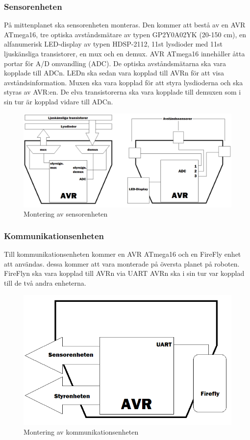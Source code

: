\subsubsection{Sensorenheten}
På mittenplanet ska sensorenheten monteras. Den kommer att bestå av en AVR ATmega16, tre optiska avståndsmätare av typen GP2Y0A02YK (20-150 cm), en alfanumerisk LED-display av typen HDSP-2112, 11st lysdioder med 11st ljuskänsliga transistorer, en mux och en demux. AVR ATmega16 innehåller åtta portar för A/D omvandling (ADC). De optiska avståndsmätarna ska vara kopplade till ADCn. LEDn ska sedan vara kopplad till AVRn för att visa avståndsinformation. Muxen ska vara kopplad för att styra lysdioderna och ska styras av AVR:en.  De elva transistorerna ska vara kopplade till demuxen som  i sin tur är kopplad vidare till ADCn.

\begin{figure}[H]
\includegraphics[angle=0,scale=0.5]{bilder/sensorer.png}
  \centering
  \caption{Montering av sensorenheten}
  \label{fig:sensorer}
\end{figure}

\subsubsection{Kommunikationsenheten}
Till kommunikationsenheten kommer en AVR ATmega16 och en FireFly enhet att användas. dessa kommer att vara monterade på översta planet på roboten. FireFlyn ska vara kopplad till AVRn via UART AVRn ska i sin tur var kopplad till de två andra enheterna.

\begin{figure}[H]
\includegraphics[angle=0,scale=0.5]{bilder/Kommunikationsenhet.png}
  \centering
  \caption{Montering av kommunikationsenheten}
  \label{fig:Kommunikationsenheten}
\end{figure}

